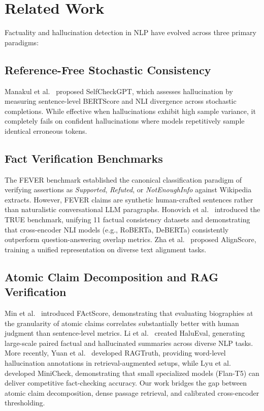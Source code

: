 \documentclass[conference]{IEEEtran}
\begin{document}
\section{Related Work}
Factuality and hallucination detection in NLP have evolved across three primary paradigms:

\subsection{Reference-Free Stochastic Consistency}
Manakul et al.~\cite{manakul2023selfcheckgpt} proposed SelfCheckGPT, which assesses hallucination by measuring sentence-level BERTScore and NLI divergence across stochastic completions. While effective when hallucinations exhibit high sample variance, it completely fails on confident hallucinations where models repetitively sample identical erroneous tokens.

\subsection{Fact Verification Benchmarks}
The FEVER benchmark \cite{thorne2018fever} established the canonical classification paradigm of verifying assertions as \textit{Supported}, \textit{Refuted}, or \textit{NotEnoughInfo} against Wikipedia extracts. However, FEVER claims are synthetic human-crafted sentences rather than naturalistic conversational LLM paragraphs. Honovich et al.~\cite{honovich2022true} introduced the TRUE benchmark, unifying 11 factual consistency datasets and demonstrating that cross-encoder NLI models (e.g., RoBERTa, DeBERTa) consistently outperform question-answering overlap metrics. Zha et al.~\cite{zha2023alignscore} proposed AlignScore, training a unified representation on diverse text alignment tasks.

\subsection{Atomic Claim Decomposition and RAG Verification}
Min et al.~\cite{min2023factscore} introduced FActScore, demonstrating that evaluating biographies at the granularity of atomic claims correlates substantially better with human judgment than sentence-level metrics. Li et al.~\cite{li2023halueval} created HaluEval, generating large-scale paired factual and hallucinated summaries across diverse NLP tasks. More recently, Yuan et al.~\cite{yuan2024ragtruth} developed RAGTruth, providing word-level hallucination annotations in retrieval-augmented setups, while Lyu et al.~\cite{lyu2024minicheck} developed MiniCheck, demonstrating that small specialized models (Flan-T5) can deliver competitive fact-checking accuracy. Our work bridges the gap between atomic claim decomposition, dense passage retrieval, and calibrated cross-encoder thresholding.
\end{document}
